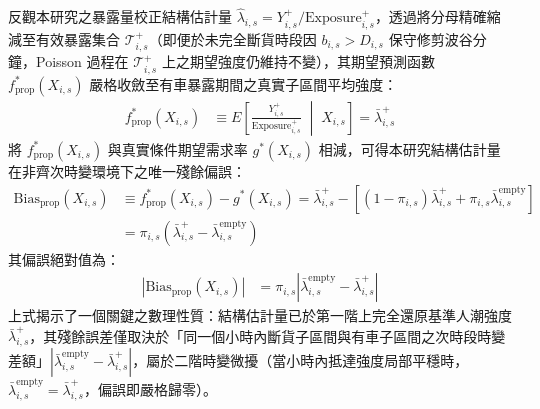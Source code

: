 反觀本研究之暴露量校正結構估計量 $\hat{\lambda}_{i,s} = Y^+_{i,s} / \text{Exposure}^+_{i,s}$，透過將分母精確縮減至有效暴露集合 $\mathcal{T}^+_{i,s}$（即便於未完全斷貨時段因 $b_{i,s} > D_{i,s}$ 保守修剪波谷分鐘，Poisson 過程在 $\mathcal{T}^+_{i,s}$ 上之期望強度仍維持不變），其期望預測函數 $f^*_{\text{prop}}(X_{i,s})$ 嚴格收斂至有車暴露期間之真實子區間平均強度：
\begin{align}
f^*_{\text{prop}}(X_{i,s}) &\equiv E\left[ \frac{Y^+_{i,s}}{\text{Exposure}^+_{i,s}} \;\middle|\; X_{i,s} \right] = \bar{\lambda}^+_{i,s}
\end{align}
將 $f^*_{\text{prop}}(X_{i,s})$ 與真實條件期望需求率 $g^*(X_{i,s})$ 相減，可得本研究結構估計量在非齊次時變環境下之唯一殘餘偏誤：
\begin{equation}
\begin{aligned}
\text{Bias}_{\text{prop}}(X_{i,s}) &\equiv f^*_{\text{prop}}(X_{i,s}) - g^*(X_{i,s}) = \bar{\lambda}^+_{i,s} - \left[ (1 - \pi_{i,s}) \bar{\lambda}^+_{i,s} + \pi_{i,s} \bar{\lambda}^{\text{empty}}_{i,s} \right] \\
&= \pi_{i,s} \left( \bar{\lambda}^+_{i,s} - \bar{\lambda}^{\text{empty}}_{i,s} \right)
\end{aligned}
\end{equation}
其偏誤絕對值為：
\begin{align}
\left| \text{Bias}_{\text{prop}}(X_{i,s}) \right| &= \pi_{i,s} \left| \bar{\lambda}^{\text{empty}}_{i,s} - \bar{\lambda}^+_{i,s} \right|
\end{align}
上式揭示了一個關鍵之數理性質：結構估計量已於第一階上完全還原基準人潮強度 $\bar{\lambda}^+_{i,s}$，其殘餘誤差僅取決於「同一個小時內斷貨子區間與有車子區間之次時段時變差額」$\left|\bar{\lambda}^{\text{empty}}_{i,s} - \bar{\lambda}^+_{i,s}\right|$，屬於二階時變微擾（當小時內抵達強度局部平穩時，$\bar{\lambda}^{\text{empty}}_{i,s} = \bar{\lambda}^+_{i,s}$，偏誤即嚴格歸零）。

